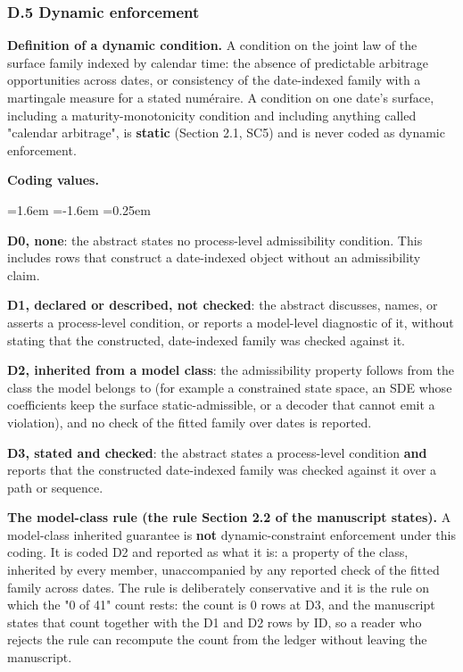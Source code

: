 \documentclass[11pt]{article}
\begin{document}
\subsubsection*{D.5 Dynamic enforcement}
\textbf{Definition of a dynamic condition.} A condition on the joint law of the surface family indexed by calendar time: the absence of predictable arbitrage opportunities across dates, or consistency of the date-indexed family with a martingale measure for a stated numéraire. A condition on one date's surface, including a maturity-monotonicity condition and including anything called "calendar arbitrage", is \textbf{static} (Section 2.1, SC5) and is never coded as dynamic enforcement.

\textbf{Coding values.}

\begin{list}{}{\leftmargin=1.6em \itemindent=-1.6em \itemsep=0.25em}
\item \textbf{D0, none}: the abstract states no process-level admissibility condition. This includes rows that construct a date-indexed object without an admissibility claim.
\item \textbf{D1, declared or described, not checked}: the abstract discusses, names, or asserts a process-level condition, or reports a model-level diagnostic of it, without stating that the constructed, date-indexed family was checked against it.
\item \textbf{D2, inherited from a model class}: the admissibility property follows from the class the model belongs to (for example a constrained state space, an SDE whose coefficients keep the surface static-admissible, or a decoder that cannot emit a violation), and no check of the fitted family over dates is reported.
\item \textbf{D3, stated and checked}: the abstract states a process-level condition \textbf{and} reports that the constructed date-indexed family was checked against it over a path or sequence.
\end{list}
\textbf{The model-class rule (the rule Section 2.2 of the manuscript states).} A model-class inherited guarantee is \textbf{not} dynamic-constraint enforcement under this coding. It is coded D2 and reported as what it is: a property of the class, inherited by every member, unaccompanied by any reported check of the fitted family across dates. The rule is deliberately conservative and it is the rule on which the "0 of 41" count rests: the count is 0 rows at D3, and the manuscript states that count together with the D1 and D2 rows by ID, so a reader who rejects the rule can recompute the count from the ledger without leaving the manuscript.
\end{document}
